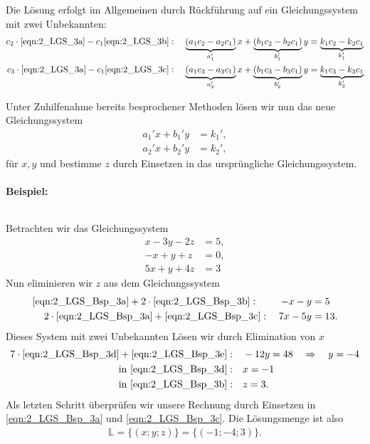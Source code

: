 Die Lösung erfolgt im Allgemeinen durch Rückführung auf ein Gleichungssystem mit zwei Unbekannten: 
\begin{align}
    c_2\cdot \eqref{eqn:2_LGS_3a} - c_1 \eqref{eqn:2_LGS_3b}: \quad \underbrace{(a_1 c_2 -a_2 c_1)}_{a_1'} x + \underbrace{(b_1 c_2 - b_2 c_1)}_{b_1'} y &= \underbrace{k_1 c_2 -k_2 c_1}_{k_1'} \\
    c_3\cdot \eqref{eqn:2_LGS_3a} - c_1 \eqref{eqn:2_LGS_3c}: \quad \underbrace{(a_1 c_3 -a_3 c_1)}_{a_2'} x + \underbrace{(b_1 c_3 - b_3 c_1)}_{b_2'} y &= \underbrace{k_1 c_3 -k_3 c_1}_{k_2'}
\end{align}

Unter Zuhilfenahme bereits besprochener Methoden lösen wir nun das neue Gleichungssystem 
\begin{subequations}
    \begin{align}
            a_1' x + b_1' y &= k_1', \\
            a_2' x + b_2' y &= k_2', 
        \end{align}
\end{subequations}
für $x,y$ und bestimme $z$ durch Einsetzen in das ursprüngliche Gleichungssystem. 

\paragraph{Beispiel:}$~$

Betrachten wir das Gleichungssystem 
\begin{subequations}
    \begin{align}
        x -3y -2z &= 5,  \label{eqn:2_LGS_Bsp_3a}\\
        -x + y + z &= 0,  \label{eqn:2_LGS_Bsp_3b}\\
        5x +y + 4z &= 3  \label{eqn:2_LGS_Bsp_3c}
    \end{align}
\end{subequations}
Nun eliminieren wir $z$ aus dem Gleichungssystem 
\begin{subequations}
    \begin{align}
        \eqref{eqn:2_LGS_Bsp_3a} + 2 \cdot \eqref{eqn:2_LGS_Bsp_3b}:  \quad\;\quad-x-y&= 5 \label{eqn:2_LGS_Bsp_3d}\\
        2\cdot\eqref{eqn:2_LGS_Bsp_3a} + \eqref{eqn:2_LGS_Bsp_3c}:  \quad 7x-5y&= 13. \label{eqn:2_LGS_Bsp_3e}
    \end{align}
\end{subequations}
Dieses System mit zwei Unbekannten Lösen wir durch Elimination von $x$
\begin{align}
    7 \cdot \eqref{eqn:2_LGS_Bsp_3d} + \eqref{eqn:2_LGS_Bsp_3e}:& \quad -12 y = 48 \quad \Rightarrow \quad y = -4 \notag \\
    \text{in } \eqref{eqn:2_LGS_Bsp_3d}:& \quad x=-1 \\
    \text{in } \eqref{eqn:2_LGS_Bsp_3b}:& \quad z=3.
\end{align}
Als letzten Schritt überprüfen wir unsere Rechnung durch Einsetzen in \eqref{eqn:2_LGS_Bsp_3a} und \eqref{eqn:2_LGS_Bsp_3c}. Die Lösungsmenge ist also 
\begin{align}
    \mathbb{L} = \{(x;y;z)\} = \{(\minus1;\minus4;3)\}.
\end{align}

